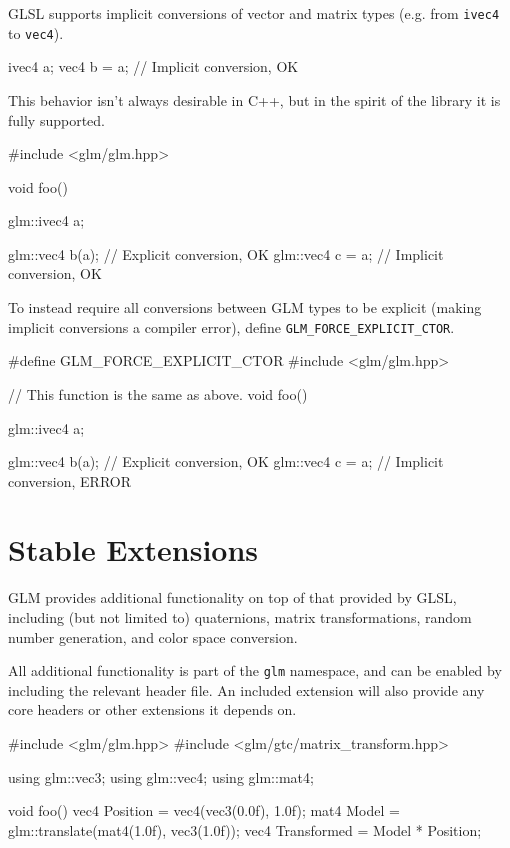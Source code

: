 \documentclass{scrartcl}
\numberwithin{figure}{subsection}
\begin{document}
GLSL supports implicit conversions of vector and matrix types (e.g. from \verb|ivec4| to \verb|vec4|).

\begin{glslcode}
ivec4 a;
vec4 b = a; // Implicit conversion, OK
\end{glslcode}

This behavior isn't always desirable in C++, but in the spirit of the library it is fully supported.

\begin{cppcode}
#include <glm/glm.hpp>

void foo()
{
  glm::ivec4 a;

  glm::vec4 b(a); // Explicit conversion, OK
  glm::vec4 c = a; // Implicit conversion, OK
}
\end{cppcode}

To instead require all conversions between GLM types to be explicit (making implicit conversions a compiler error), define \verb|GLM_FORCE_EXPLICIT_CTOR|.

\begin{cppcode}
#define GLM_FORCE_EXPLICIT_CTOR
#include <glm/glm.hpp>

// This function is the same as above.
void foo()
{
  glm::ivec4 a;

  glm::vec4 b(a); // Explicit conversion, OK
  glm::vec4 c = a; // Implicit conversion, ERROR
}
\end{cppcode}

\section{Stable Extensions}

GLM provides additional functionality on top of that provided by GLSL, including (but not limited to) quaternions, matrix transformations, random number generation, and color space conversion.   

All additional functionality is part of the \verb|glm| namespace, and can be enabled by including the relevant header file.  An included extension will also provide any core headers or other extensions it depends on.

\begin{cppcode}
#include <glm/glm.hpp>
#include <glm/gtc/matrix_transform.hpp>

using glm::vec3;
using glm::vec4;
using glm::mat4;

void foo()
{
  vec4 Position = vec4(vec3(0.0f), 1.0f);
  mat4 Model = glm::translate(mat4(1.0f), vec3(1.0f));
  vec4 Transformed = Model * Position;
}
\end{cppcode}
\end{document}
